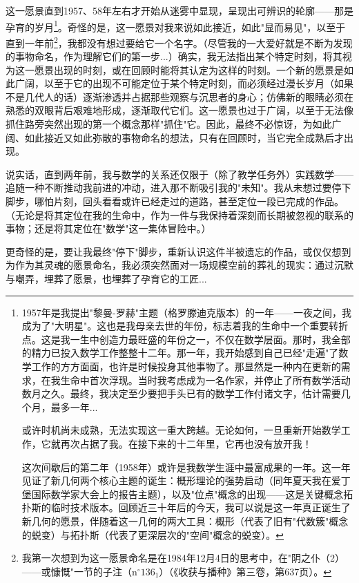 这一愿景直到1957、58年左右才开始从迷雾中显现，呈现出可辨识的轮廓——那是孕育的岁月\footnote{1957年是我提出"黎曼-罗赫"主题（格罗滕迪克版本）的一年——一夜之间，我成为了"大明星"。这也是我母亲去世的年份，标志着我的生命中一个重要转折点。这是我一生中创造力最旺盛的年份之一，不仅在数学层面。那时，我全部的精力已投入数学工作整整十二年。那一年，我开始感到自己已经"走遍"了数学工作的方方面面，也许是时候投身其他事物了。那显然是一种内在更新的需求，在我生命中首次浮现。当时我考虑成为一名作家，并停止了所有数学活动数月之久。最终，我决定至少要把手头已有的数学工作付诸文字，估计需要几个月，最多一年...

或许时机尚未成熟，无法实现这一重大跨越。无论如何，一旦重新开始数学工作，它就再次占据了我。在接下来的十二年里，它再也没有放开我！

这次间歇后的第二年（1958年）或许是我数学生涯中最富成果的一年。这一年见证了新几何两个核心主题的诞生：概形理论的强势启动（同年夏天我在爱丁堡国际数学家大会上的报告主题），以及"位点"概念的出现——这是关键概念拓扑斯的临时技术版本。回顾近三十年后的今天，我可以说是这一年真正诞生了新几何的愿景，伴随着这一几何的两大工具：概形（代表了旧有"代数簇"概念的蜕变）与拓扑斯（代表了更深层次的"空间"概念的蜕变）。}。奇怪的是，这一愿景对我来说如此接近，如此"显而易见"，以至于直到一年前\footnote{我第一次想到为这一愿景命名是在1984年12月4日的思考中，在"阴之仆（2）——或慷慨"一节的子注（$\mathrm{n}^{\circ} 136_{1}$）（《收获与播种》第三卷，第637页）。}，我都没有想过要给它一个名字。（尽管我的一大爱好就是不断为发现的事物命名，作为理解它们的第一步...）确实，我无法指出某个特定时刻，将其视为这一愿景出现的时刻，或在回顾时能将其认定为这样的时刻。一个新的愿景是如此广阔，以至于它的出现不可能定位于某个特定时刻，而必须经过漫长岁月（如果不是几代人的话）逐渐渗透并占据那些观察与沉思者的身心；仿佛新的眼睛必须在熟悉的双眼背后艰难地形成，逐渐取代它们。这一愿景也过于广阔，以至于无法像抓住路旁突然出现的第一个概念那样"抓住"它。因此，最终不必惊讶，为如此广阔、如此接近又如此弥散的事物命名的想法，只有在回顾时，当它完全成熟后才出现。

说实话，直到两年前，我与数学的关系还仅限于（除了教学任务外）实践数学——追随一种不断推动我前进的冲动，进入那不断吸引我的"未知"。我从未想过要停下脚步，哪怕片刻，回头看看或许已经走过的道路，甚至定位一段已完成的作品。（无论是将其定位在我的生命中，作为一件与我保持着深刻而长期被忽视的联系的事物；还是将其定位在"数学"这一集体冒险中。）

更奇怪的是，要让我最终"停下"脚步，重新认识这件半被遗忘的作品，或仅仅想到为作为其灵魂的愿景命名，我必须突然面对一场规模空前的葬礼的现实：通过沉默与嘲弄，埋葬了愿景，也埋葬了孕育它的工匠...
